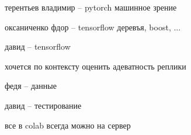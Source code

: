 терентьев владимир  --  pytorch
машинное зрение

оксаниченко фдор    -- tensorflow
деревъя, boost, ... 


давид               -- tensorflow


хочется по контексту оценить адеватность реплики

федя -- данные

давид -- тестирование


все в colab
всегда можно на сервер



